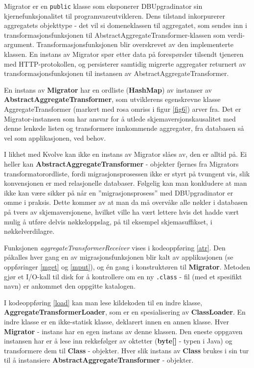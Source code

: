Migrator er en \texttt{public} klasse som eksponerer DBUpgradinator sin kjernefunksjonalitet til programvareutvikleren. Dens tilstand inkorpurerer aggregatets objekttype - det vil si domeneklassen til aggregatet, som sendes inn i transformasjonsfunksjonen til Abstract\-AggregateTransformer-klassen som verdi-argument. Transformasjonsfunksjonen blir overskrevet av den implementerte klassen. En instans av Migrator spør etter data på forespørsler tilsendt tjeneren med HTTP-protokollen, og persisterer samtidig migrerte aggregater returnert av transformasjonsfunksjonen til instansen av AbstractAggregateTransformer.

En instans av \textbf{Migrator} har en ordliste (\textbf{HashMap}) av instanser av \textbf{AbstractAggregateTransformer}, som utviklerens egenskrevne klasse AggregateTransformer (markert med rosa omriss i figur \ref{fig6}) arver fra. Det er Migrator-instansen som har ansvar for å utlede skjemaversjonskausalitet med denne lenkede listen og transformere innkommende aggregater, fra databasen så vel som applikasjonen, ved behov.

I likhet med Kvolve kan ikke en instans av Migrator slåes av, den er alltid på. Ei heller kan \textbf{AbstractAggregateTransformer} - objekter fjernes fra Migrators transformator\-ordliste, fordi migrasjonsprosessen ikke er styrt på tvungent vis, slik konvensjonen er med relasjonelle databaser. Følgelig kan man konkludere at man ikke kan være sikker på når en ''migrasjonsprosess'' med DBUpgradinator er omme i praksis. Dette kommer av at man da må overvåke alle nøkler i databasen på tvers av skjemaversjonene, hvilket ville ha vært lettere hvis det hadde vært mulig å utføre delvis nøkkeloppslag, på til eksempel skjemasuffikset, i nøkkelverdi\-lagre.



Funksjonen \emph{aggregateTransformerReceiver} vises i kodeoppføring \ref{atr}. Den påkalles hver gang en av migrasjonsfunksjonen blir kalt av applikasjonen (se oppføringer \ref{mget} og \ref{mput}), og én gang i konstruktøren til \textbf{Migrator}. Metoden gjør et I/O-kall til disk for å kontrollere om en ny \texttt{.class} - fil (med et spesifikt navn) er ankommet den oppgitte katalogen.



I kodeoppføring \ref{load} kan man lese kildekoden til en indre klasse, \textbf{AggregateTransformerLoader}, som er en spesialisering av \textbf{ClassLoader}. En indre klasse er en ikke-statisk klasse, deklarert innen en annen klasse. Hver \textbf{Migrator} - instans har en egen instans av denne klassen. Den eneste oppgaven instansen har er å lese inn rekkefølger av oktetter (\textbf{byte[]} - typen i Java) og transformere dem til \textbf{Class} - objekter. Hver slik instans av \textbf{Class} brukes i sin tur til å instansiere \textbf{AbstractAggregateTransformer} - objekter.

